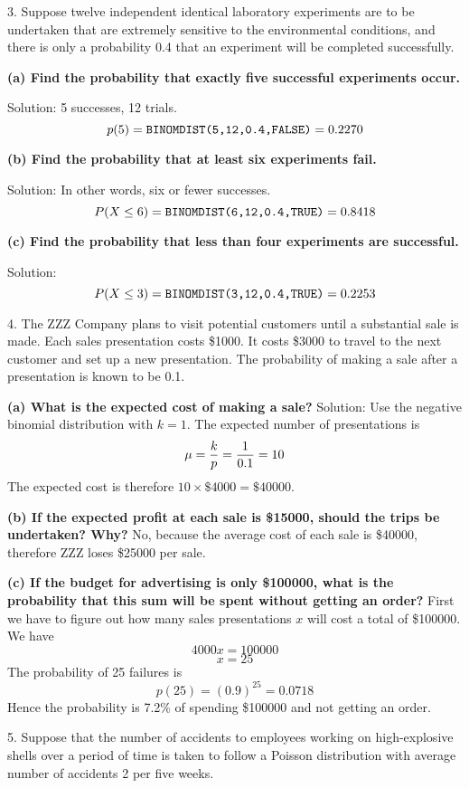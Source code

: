 \vfill
\eject

3. Suppose twelve independent identical laboratory experiments are to be
undertaken that are extremely sensitive to the environmental conditions, and there
is only a probability 0.4 that an experiment will be completed
successfully.

\bigskip
{\bf (a) Find the probability that exactly five successful experiments occur.}

\bigskip
Solution: 5 successes, 12 trials.
$$p(5)=\hbox{\tt BINOMDIST(5,12,0.4,FALSE)}=0.2270$$

\bigskip
{\bf (b) Find the probability that at least six experiments fail.}

\bigskip
Solution: In other words, six or fewer successes.
$$P(X\le6)=\hbox{\tt BINOMDIST(6,12,0.4,TRUE)}=0.8418$$

\bigskip
{\bf (c) Find the probability that less than four experiments are successful.}

\bigskip
Solution:
$$P(X\le3)=\hbox{\tt BINOMDIST(3,12,0.4,TRUE)}=0.2253$$

\vfill
\eject

4. The ZZZ Company plans to visit potential customers until a substantial
sale is made. Each sales presentation costs \$1000.
It costs \$3000 to travel to the next customer and set up a new
presentation.
The probability of making a sale after a presentation is known to be 0.1.

\bigskip
{\bf (a) What is the expected cost of making a sale?}
\bigskip
Solution: Use the negative binomial distribution with $k=1$.
The expected number of presentations is
$$\mu={k\over p}={1\over0.1}=10$$
The expected cost is therefore $10\times\$4000=\$40000$.

\bigskip
{\bf (b) If the expected profit at each sale is \$15000, should the
trips be undertaken? Why?}
\bigskip
No, because the average cost of each sale is \$40000, therefore ZZZ
loses \$25000 per sale.

\bigskip
{\bf (c) If the budget for advertising is only \$100000, what is the
probability that this sum will be spent without getting an order?}
\bigskip
First we have to figure out how many sales presentations $x$ will cost
a total of \$100000. We have
$$4000x=100000$$
$$x=25$$
The probability of 25 failures is
$$p(25)=(0.9)^{25}=0.0718$$
Hence the probability is 7.2\% of spending \$100000 and not getting an order.

\vfill
\eject

5. Suppose that the number of accidents to employees working on high-explosive shells
over a period of time is taken to follow a Poisson distribution with average number of
accidents 2 per five weeks.

